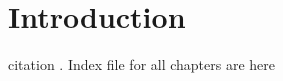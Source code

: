 \documentclass[../master.tex]{subfiles}
\begin{document}
\chapter{Introduction}
citation \cite{Poole2017}.
Index file for all chapters are here
\end{document}
